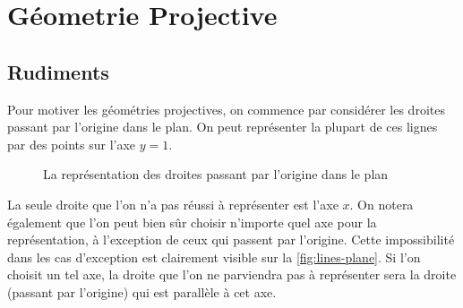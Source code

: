 \documentclass[12pt, oneside]{memoir}
\theoremstyle{definition}
\theoremstyle{remark}
\begin{document}
\chapter{Géometrie Projective}
\section{Rudiments}
Pour motiver les géométries projectives, on commence par considérer
les droites passant par l'origine dans le plan. On peut représenter la
plupart de ces lignes par des points sur l'axe $y=1$.
\begin{figure}[H]
  \centering
  \caption{La représentation des droites passant par l'origine dans le
    plan}
  \label{fig:lines-plane}
\end{figure}
La seule droite que l'on n'a pas réussi à représenter est l'axe
$x$. On notera également que l'on peut bien sûr choisir n'importe quel
axe pour la représentation, à l'exception de ceux qui passent par
l'origine. Cette impossibilité dans les cas d'exception est clairement
visible sur la \autoref{fig:lines-plane}. Si l'on choisit un tel axe,
la droite que l'on ne parviendra pas à représenter sera la droite
(passant par l'origine) qui est parallèle à cet axe.
\end{document}
